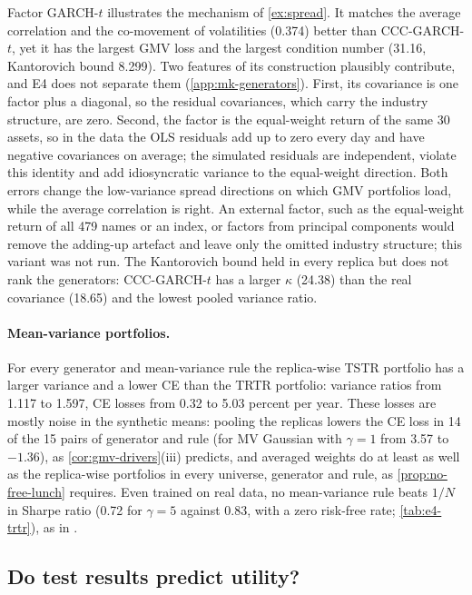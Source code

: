 Factor GARCH-$t$ illustrates the mechanism of \cref{ex:spread}. It matches the average correlation
and the co-movement of volatilities (0.374) better than CCC-GARCH-$t$, yet it has the largest GMV
loss and the largest condition number (31.16, Kantorovich bound 8.299). Two features of its
construction plausibly contribute, and E4 does not separate them (\cref{app:mk-generators}).
First, its covariance is one factor plus a diagonal, so the residual covariances, which carry the
industry structure, are zero. Second, the factor is the equal-weight return of the same 30
assets, so in the data the OLS residuals add up to zero every day and have negative covariances
on average; the simulated residuals are independent, violate this identity and add idiosyncratic
variance to the equal-weight direction. Both errors change the low-variance spread directions on
which GMV portfolios load, while the average correlation is right. An external factor, such as
the equal-weight return of all 479 names or an index, or factors from principal components would
remove the adding-up artefact and leave only the omitted industry structure; this variant was not
run. The Kantorovich bound held in every replica but does not rank the generators: CCC-GARCH-$t$
has a larger $\kappa$ (24.38) than the real \TRAIN{} covariance (18.65) and the lowest pooled
variance ratio.

\paragraph{Mean-variance portfolios.}
For every generator and mean-variance rule the replica-wise TSTR portfolio has a larger \TEST{}
variance and a lower CE than the TRTR portfolio: variance ratios from 1.117 to 1.597, CE losses
from 0.32 to 5.03 percent per year. These losses are mostly noise in the synthetic means: pooling
the replicas lowers the CE loss in 14 of the 15 pairs of generator and rule (for MV Gaussian with
$\gamma=1$ from 3.57 to $-1.36$), as \cref{cor:gmv-drivers}(iii) predicts, and averaged weights do
at least as well as the replica-wise portfolios in every universe, generator and rule, as
\cref{prop:no-free-lunch} requires. Even trained on real data, no mean-variance rule beats $1/N$
in Sharpe ratio (0.72 for $\gamma=5$ against 0.83, with a zero risk-free rate;
\cref{tab:e4-trtr}), as in \citet{demiguel2009optimal}.

\subsection{Do test results predict utility?}\label{sec:mk-link}

